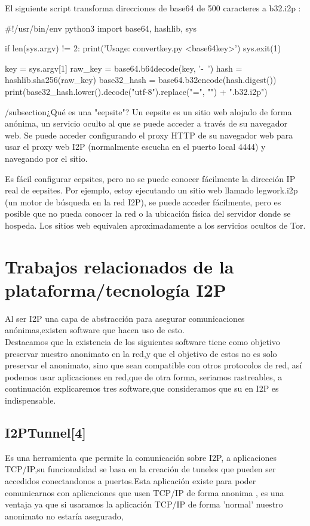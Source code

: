 \documentclass[12]{article}
\begin{document}
 El siguiente script transforma direcciones de base64 de 500 caracteres a b32.i2p :
 
 \#!/usr/bin/env python3
import base64, hashlib, sys

if len(sys.argv) != 2:
  print('Usage: convertkey.py <base64key>')
  sys.exit(1)

key = sys.argv[1]
raw\_key = base64.b64decode(key, '-~')
hash = hashlib.sha256(raw\_key)
base32\_hash = base64.b32encode(hash.digest())
print(base32\_hash.lower().decode("utf-8").replace("=", "") + ".b32.i2p")
 
/subsection{¿Qué es una "eepsite"?}
Un eepsite es un sitio web alojado de forma anónima, un servicio oculto al que se puede acceder a través de su navegador web. Se puede acceder configurando el proxy HTTP de su navegador web para usar el proxy web I2P (normalmente escucha en el puerto local 4444) y navegando por el sitio.

Es fácil configurar eepsites, pero no se puede conocer fácilmente la dirección IP real de eepsites. Por ejemplo, estoy ejecutando un sitio web llamado legwork.i2p (un motor de búsqueda en la red I2P), se puede acceder fácilmente, pero es posible que no pueda conocer la red o la ubicación física del servidor donde se hospeda. Los sitios web equivalen aproximadamente a los servicios ocultos de Tor.

\pagebreak

\section{Trabajos relacionados de la plataforma/tecnología I2P}

Al ser  I2P una capa de abstracción para asegurar comunicaciones anónimas,existen software que hacen uso de esto.
\\

Destacamos que la existencia de los siguientes software tiene como objetivo preservar nuestro anonimato en la red,y que el objetivo de estos no es solo preservar
el anonimato, sino que sean compatible con otros protocolos de red, así podemos usar aplicaciones en red,que de otra forma, seriamos rastreables,
a continuación explicaremos tres software,que consideramos que su en I2P  es indispensable.
\subsection{I2PTunnel[4]}

Es una herramienta que permite la comunicación sobre I2P, a aplicaciones TCP/IP,su funcionalidad se basa en la creación de tuneles que pueden ser accedidos
conectandonos a puertos.Esta aplicación existe para poder comunicarnos con aplicaciones que usen TCP/IP de forma anonima , es una ventaja ya que si usaramos la aplicación TCP/IP de forma 'normal'
nuestro anonimato no estaría asegurado,
\\
\end{document}
